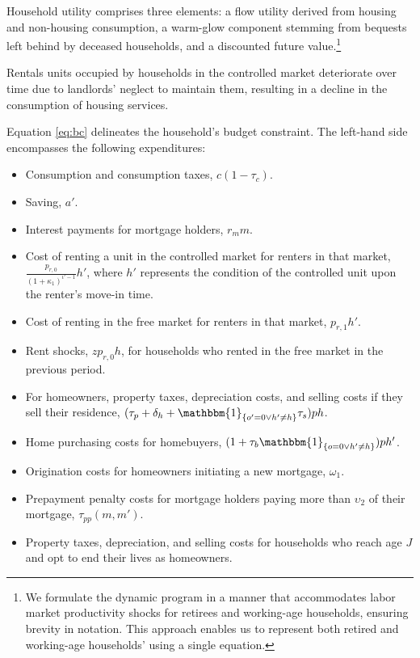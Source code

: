 \documentclass[parskip=full]{article}
\newcommand{\indicator}[1]{\mathbbm{1}_{\left\{ {#1} \right\} }}
\begin{document}
Household utility comprises three elements: a flow utility derived from housing and non-housing consumption, a warm-glow component stemming from bequests left behind by deceased households, and a discounted future value.\footnote{We formulate the dynamic program in a manner that accommodates labor market productivity shocks for retirees and working-age households, ensuring brevity in notation. This approach enables us to represent both retired and working-age households' using a single equation.}

Rentals units occupied by households in the controlled market deteriorate over time due to landlords' neglect to maintain them, resulting in a decline in the consumption of housing services.

Equation \eqref{eq:bc} delineates the household's budget constraint. The left-hand side encompasses the following expenditures:
\begin{itemize}
    \item Consumption and consumption taxes, $c(1-\tau_{c})$.
    \item Saving, $a'$.
    \item Interest payments for mortgage holders, $r_{m}m$.
    \item Cost of renting a unit in the controlled market for renters in that market, $\frac{p_{r,0}}{(1+\kappa_{1})^{\iota'-1}}h'$, where $h'$ represents the condition of the controlled unit upon the renter's move-in time.
    \item Cost of renting in the free market for renters in that market, $p_{r,1}h'$.
    \item Rent shocks, $z p_{r,0}h$, for households who rented in the free market in the previous period.
    \item For homeowners, property taxes, depreciation costs, and selling costs if they sell their residence, $(\tau_{p}+\delta_{h}+\indicator{o'=0\vee h'\neq h}\tau_{s})ph$.
    \item Home purchasing costs for homebuyers, $(1+\tau_{b}\indicator{o=0\vee h'\neq h})ph'$.
    \item Origination costs for homeowners initiating a new mortgage, $\omega_{1}$.
    \item Prepayment penalty costs for mortgage holders paying more than $\upsilon_{2}$ of their mortgage, $\tau_{pp}(m,m')$.
    \item Property taxes, depreciation, and selling costs for households who reach age $J$ and opt to end their lives as homeowners.
\end{itemize}
\end{document}

